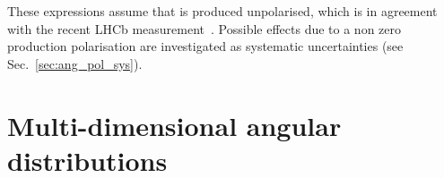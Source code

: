 %
%


These expressions assume that \Lb is produced unpolarised, which is in agreement with the recent LHCb
measurement~\cite{LHCb-PAPER-2012-057}. Possible effects due to a non zero production polarisation
are investigated as systematic uncertainties (see Sec.~\ref{sec:ang_pol_sys}).


\section{Multi-dimensional angular distributions}
\label{sec:multidim_ang_distrib}

